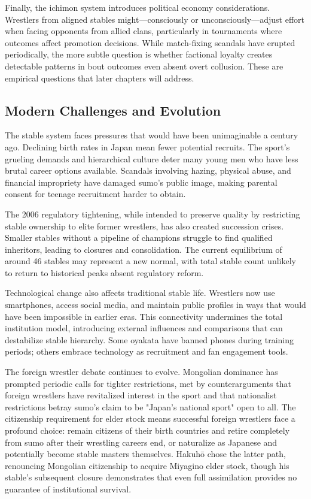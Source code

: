 Finally, the ichimon system introduces political economy considerations. Wrestlers from aligned stables might—consciously or unconsciously—adjust effort when facing opponents from allied clans, particularly in tournaments where outcomes affect promotion decisions. While match-fixing scandals have erupted periodically, the more subtle question is whether factional loyalty creates detectable patterns in bout outcomes even absent overt collusion. These are empirical questions that later chapters will address.

\subsection{Modern Challenges and Evolution}

The stable system faces pressures that would have been unimaginable a century ago. Declining birth rates in Japan mean fewer potential recruits. The sport's grueling demands and hierarchical culture deter many young men who have less brutal career options available. Scandals involving hazing, physical abuse, and financial impropriety have damaged sumo's public image, making parental consent for teenage recruitment harder to obtain.

The 2006 regulatory tightening, while intended to preserve quality by restricting stable ownership to elite former wrestlers, has also created succession crises. Smaller stables without a pipeline of champions struggle to find qualified inheritors, leading to closures and consolidation. The current equilibrium of around 46 stables may represent a new normal, with total stable count unlikely to return to historical peaks absent regulatory reform.

Technological change also affects traditional stable life. Wrestlers now use smartphones, access social media, and maintain public profiles in ways that would have been impossible in earlier eras. This connectivity undermines the total institution model, introducing external influences and comparisons that can destabilize stable hierarchy. Some oyakata have banned phones during training periods; others embrace technology as recruitment and fan engagement tools.

The foreign wrestler debate continues to evolve. Mongolian dominance has prompted periodic calls for tighter restrictions, met by counterarguments that foreign wrestlers have revitalized interest in the sport and that nationalist restrictions betray sumo's claim to be "Japan's national sport" open to all. The citizenship requirement for elder stock means successful foreign wrestlers face a profound choice: remain citizens of their birth countries and retire completely from sumo after their wrestling careers end, or naturalize as Japanese and potentially become stable masters themselves. Hakuhō chose the latter path, renouncing Mongolian citizenship to acquire Miyagino elder stock, though his stable's subsequent closure demonstrates that even full assimilation provides no guarantee of institutional survival.

